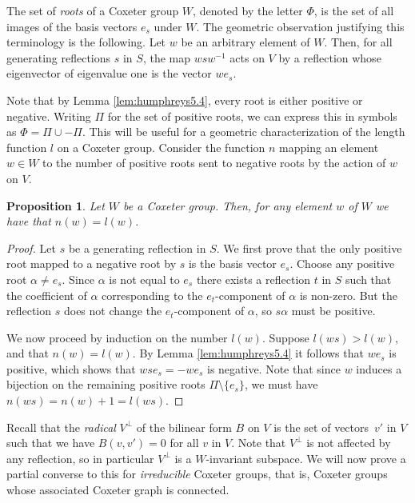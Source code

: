 \documentclass{article}
\newtheorem{proposition}[theorem]{Proposition}
\theoremstyle{definition}
\begin{document}
The set of \textit{roots} of a Coxeter group $W$, denoted by the letter $\Phi$, is the set of all images of the basis vectors $e_s$ under $W$. The geometric observation justifying this terminology is the following. Let $w$ be an arbitrary element of $W$. Then, for all generating reflections $s$ in $S$, the map $wsw^{-1}$ acts on $V$ by a reflection whose eigenvector of eigenvalue one is the vector $we_s$.

Note that by Lemma \ref{lem:humphreys5.4}, every root is either positive or negative. Writing $\Pi$ for the set of positive roots, we can express this in symbols as $\Phi = \Pi \cup -\Pi$. This will be useful for a geometric characterization of the length function $l$ on a Coxeter group. Consider the function $n$ mapping an element $w \in W$ to the number of positive roots sent to negative roots by the action of $w$ on $V$.

\begin{proposition}\label{prop:n=l}
Let $W$ be a Coxeter group. Then, for any element $w$ of $W$ we have that $n(w) = l(w)$.
\end{proposition}

\begin{proof}
Let $s$ be a generating reflection in $S$. We first prove that the only positive root mapped to a negative root by $s$ is the basis vector $e_s$. Choose any positive root $\alpha \neq e_s$. Since $\alpha$ is not equal to $e_s$ there exists a reflection $t$ in $S$ such that the coefficient of $\alpha$ corresponding to the $e_t$-component of $\alpha$ is non-zero. But the reflection $s$ does not change the $e_t$-component of $\alpha$, so $s\alpha$ must be positive.

We now proceed by induction on the number $l(w)$. Suppose $l(ws) > l(w)$, and that $n(w) = l(w)$. By Lemma \ref{lem:humphreys5.4} it follows that $we_s$ is positive, which shows that $wse_s = -we_s$ is negative. Note that since $w$ induces a bijection on the remaining positive roots $\Pi \setminus \{e_s\}$, we must have $n(ws) = n(w) + 1 = l(ws)$.
\end{proof}

Recall that the \textit{radical} $V^\perp$ of the bilinear form $B$ on $V$ is the set of vectors~$v'$ in $V$ such that we have $B(v, v') = 0$ for all $v$ in $V$. Note that $V^\perp$ is not affected by any reflection, so in particular $V^\perp$ is a $W$-invariant subspace. We will now prove a partial converse to this for \textit{irreducible} Coxeter groups, that is, Coxeter groups whose associated Coxeter graph is connected.
\end{document}
